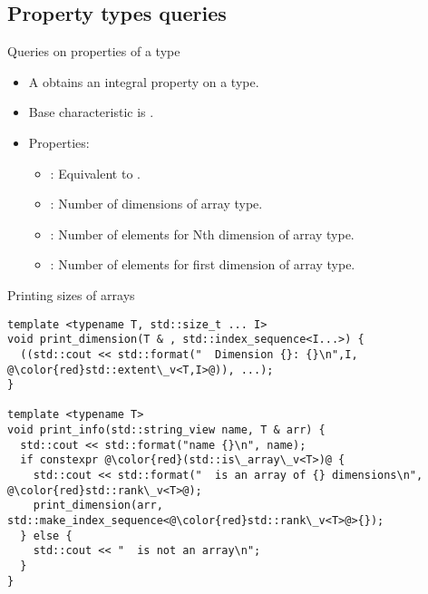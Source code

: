 \subsection{Property types queries}

\begin{frame}[t,fragile]{Queries on properties of a type}
\begin{itemize}
  \item A  obtains an integral property 
        on a type.
  
  \item Base characteristic is .

  \item Properties:
    \begin{itemize}
      \item {}: Equivalent to .
      \item {}: Number of dimensions of array type.
      \item {}: Number of elements for Nth dimension of array type.
      \item {}: Number of elements for first dimension of array type.
    \end{itemize}
\end{itemize}
\end{frame}

\begin{frame}[t,fragile]
\begin{block}{Printing sizes of arrays}
\begin{lstlisting}[escapechar=@]
template <typename T, std::size_t ... I>
void print_dimension(T & , std::index_sequence<I...>) { 
  ((std::cout << std::format("  Dimension {}: {}\n",I, @\color{red}std::extent\_v<T,I>@)), ...);
}

template <typename T>
void print_info(std::string_view name, T & arr) {
  std::cout << std::format("name {}\n", name);
  if constexpr @\color{red}(std::is\_array\_v<T>)@ {
    std::cout << std::format("  is an array of {} dimensions\n", @\color{red}std::rank\_v<T>@);
    print_dimension(arr, std::make_index_sequence<@\color{red}std::rank\_v<T>@>{});
  } else {
    std::cout << "  is not an array\n";
  }
}
\end{lstlisting}
\end{block}
\end{frame}
